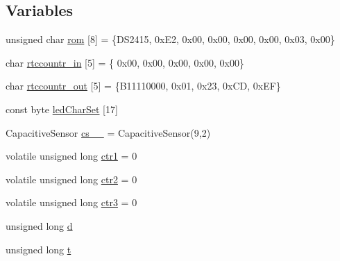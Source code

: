 \subsection*{Variables}
\begin{DoxyCompactItemize}
\item 
unsigned char \hyperlink{OWGeneric__DangerShield_8ino_a8beb78e2b3f2cb6e34f34861a875ca0b}{rom} \mbox{[}8\mbox{]} = \{D\-S2415, 0x\-E2, 0x00, 0x00, 0x00, 0x00, 0x03, 0x00\}
\item 
char \hyperlink{OWGeneric__DangerShield_8ino_a81a94fdcf5fd0721c26e50dd4cd32b1e}{rtccountr\-\_\-in} \mbox{[}5\mbox{]} = \{ 0x00, 0x00, 0x00, 0x00, 0x00\}
\item 
char \hyperlink{OWGeneric__DangerShield_8ino_ac150db4005f4bac8510f9e697f1c291a}{rtccountr\-\_\-out} \mbox{[}5\mbox{]} = \{B11110000, 0x01, 0x23, 0x\-C\-D, 0x\-E\-F\}
\item 
const byte \hyperlink{OWGeneric__DangerShield_8ino_a9fd6363d57e3788ec90445fb8f7e46e6}{led\-Char\-Set} \mbox{[}17\mbox{]}
\item 
Capacitive\-Sensor \hyperlink{OWGeneric__DangerShield_8ino_af6f50cfb8376b0de0f518da1b7d1b2f8}{cs\-\_\-\_} = Capacitive\-Sensor(9,2)
\item 
volatile unsigned long \hyperlink{OWGeneric__DangerShield_8ino_a68c3f19187ae81a2c190ec87b5874dd3}{ctr1} = 0
\item 
volatile unsigned long \hyperlink{OWGeneric__DangerShield_8ino_ab93a6d1ba9d998ab5d4f846e8cea0149}{ctr2} = 0
\item 
volatile unsigned long \hyperlink{OWGeneric__DangerShield_8ino_a9edb10c1b079b5c8e77748ca203036eb}{ctr3} = 0
\item 
unsigned long \hyperlink{OWGeneric__DangerShield_8ino_a22871ee78191bcd7676a38358795104e}{d}
\item 
unsigned long \hyperlink{OWGeneric__DangerShield_8ino_a1ffe6f4d89de83b8119fa91af85fcacc}{t}
\end{DoxyCompactItemize}


